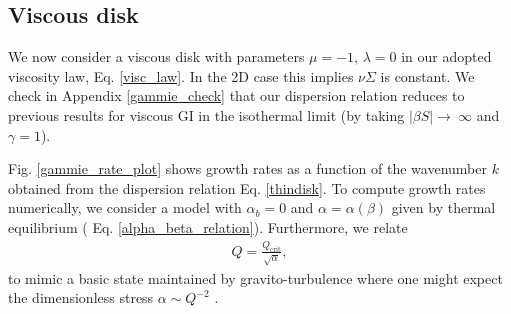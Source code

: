 %

\subsection{Viscous disk}\label{2dvisc}
We now consider a viscous disk with parameters $\mu=-1,\,\lambda=0$ in our
adopted viscosity law, Eq. \ref{visc_law}. In the 2D case this implies
$\nu\Sigma$ is constant.   
We check in Appendix \ref{gammie_check} that our dispersion relation
reduces to previous results for viscous GI in the isothermal limit (by
taking $|\beta S|\to~\infty$ and $\gamma=1$).   

Fig. \ref{gammie_rate_plot} shows growth rates as a function of the
wavenumber $k$ obtained from the dispersion relation
Eq. \ref{thindisk}.  To compute growth rates numerically, 
 we consider a model with $\alpha_b=0$ and
$\alpha=\alpha(\beta)$ given by thermal equilibrium (
Eq. \ref{alpha_beta_relation}). Furthermore, we relate 
\begin{align}
  Q = \frac{Q_\mathrm{crit}}{\sqrt{\alpha}},\label{Qalpha}
\end{align}
to mimic a basic state maintained by gravito-turbulence where one
might expect the dimensionless stress $\alpha \sim Q^{-2}$
\citep{lin87}.   

